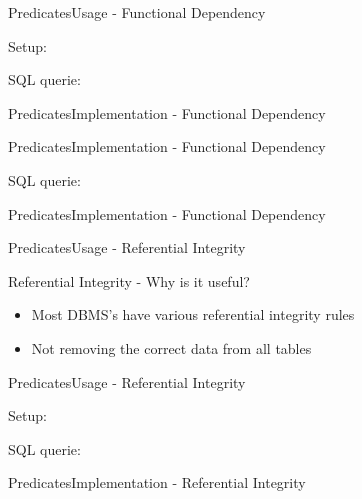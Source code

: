 \begin{frame}{Predicates}{Usage - Functional Dependency}
	\begin{block}{Setup:}
	\end{block}
	\begin{block}{SQL querie:}
	\end{block}
\end{frame}

\begin{frame}{Predicates}{Implementation - Functional Dependency}
\end{frame}

\begin{frame}{Predicates}{Implementation - Functional Dependency}
	\begin{block}{SQL querie:}
	\end{block}
\end{frame}

\begin{frame}{Predicates}{Implementation - Functional Dependency}
\end{frame}

\begin{frame}{Predicates}{Usage - Referential Integrity}
	\begin{block}{Referential Integrity - Why is it useful?}
		\begin{itemize}
			\item<1-> Most DBMS's have various referential integrity rules
			\item<2-> Not removing the correct data from all tables
		\end{itemize}
	\end{block}
\end{frame}

\begin{frame}{Predicates}{Usage - Referential Integrity}
  \begin{block}{Setup:}
	\end{block}
	\begin{block}{SQL querie:}
	\end{block}
\end{frame}

\begin{frame}{Predicates}{Implementation - Referential Integrity}
\end{frame}

